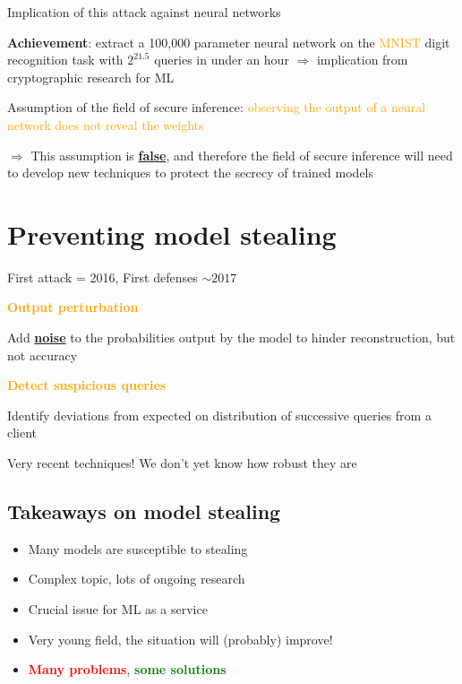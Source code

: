 \documentclass[11pt]{article}
\begin{document}
Implication of this attack against neural networks

\textbf{Achievement}: extract a 100,000 parameter neural network on the \textcolor{orange}{MNIST} digit recognition task with $2^{21.5}$ queries in under an hour $\Rightarrow$ implication from cryptographic research for ML

Assumption of the field of secure inference:  \textcolor{orange}{observing the output of a neural network does not reveal the weights}

$\Rightarrow$ This assumption is  \textbf{\underline{false}}, and therefore the field of secure inference will need to develop new techniques to protect the secrecy of trained models

\section*{Preventing model stealing}

First attack = 2016, First defenses $\sim 2017$

\textbf{\textcolor{orange}{Output perturbation}}

Add \textbf{\underline{noise}} to the probabilities output by the model to hinder reconstruction, but not accuracy

\textbf{\textcolor{orange}{Detect suspicious queries}}

Identify deviations from expected on distribution of successive queries from a client 

\begin{center}

	Very recent techniques! We don't yet know how robust they are
\end{center}

\subsection*{Takeaways on model stealing}
\begin{itemize}
	\item Many models are susceptible to stealing
	\item Complex topic, lots of ongoing research
	\item Crucial issue for ML as a service
	\item Very young field, the situation will (probably) improve!
	\item \textbf{\textcolor{red}{Many problems}}, \textbf{\textcolor{green}{some solutions}}
\end{itemize}
\end{document}
